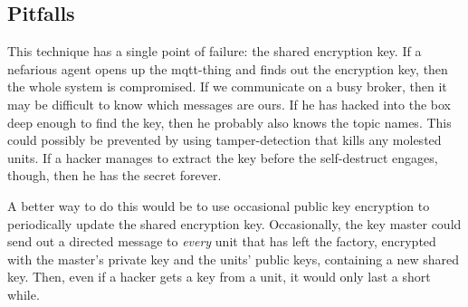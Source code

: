 \documentclass[final,titlepage,onecolumn]{article}
\begin{document}
\subsection{Pitfalls}

This technique has a single point of failure: the shared encryption key. If a nefarious agent opens up the mqtt-thing and finds out the encryption key, then the whole system is compromised. If we communicate on a busy broker, then it may be difficult to know which messages are ours. If he has hacked into the box deep enough to find the key, then he probably also knows the topic names. This could possibly be prevented by using tamper-detection that kills any molested units. If a hacker manages to extract the key before the self-destruct engages, though, then he has the secret forever.

A better way to do this would be to use occasional public key encryption to periodically update the shared encryption key. Occasionally, the key master could send out a directed message to \emph{every} unit that has left the factory, encrypted with the master's private key and the units' public keys, containing a new shared key. Then, even if a hacker gets a key from a unit, it would only last a short while.
\end{document}
